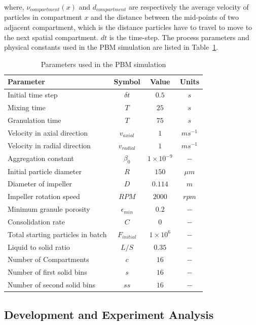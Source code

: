 \documentclass[preprint,11pt,authoryear]{elsarticle}
\begin{document}
where, $\nu_{compartment}(x)$ and $d_{compartment}$ are respectively the average velocity of 
particles in compartment $x$ and the distance between the mid-points of two adjacent compartment, 
which is the distance particles have to travel to move to the next spatial compartment. $dt$ is the 
time-step.
The process parameters and physical constants used in the PBM simulation are listed in Table~\ref{table:mthds_pbm_parameters}.
\begin{table}
\caption{Parameters used in the PBM simulation}
\label{table:mthds_pbm_parameters}
\begin{center}
\begin{tabular}{l|c|c|c}
\hline
\bf{Parameter} &\bf{Symbol} &\bf{Value} &\bf{Units}\\
\hline
Initial time step & $\delta t$ & $0.5$ & $s$\\
Mixing time & $T$ & $25$ & $s$\\
Granulation time & $T$ & $75$ & $s$\\
Velocity in axial direction & $v_{axial}$ & $1$ & $ms^{-1}$\\
Velocity in radial direction & $v_{radial}$ & $1$ & $ms^{-1}$\\
Aggregation constant & $\beta_0$ & $1\times10^{-9}$ & $-$\\
Initial particle diameter & $R$ & $150$ & $\mu m$\\
Diameter of impeller & $D$ & $0.114$ & $m$ \\
Impeller rotation speed & $RPM$ & $2000$ & $rpm$\\
Minimum granule porosity & $\epsilon_{min}$ & $0.2$ & $-$\\
Consolidation rate & $C$ & $0$ & $-$\\
Total starting particles in batch & $F_{initial}$ & $1 \times 10^{6}$ & $-$\\
Liquid to solid ratio & $L/S$ & $0.35$ & $-$ \\
Number of Compartments & $c$ & $16$ & $-$ \\
Number of first solid bins & $s$ & $16$ & $-$\\
Number of second solid bins & $ss$ & $16$ & $-$\\
\hline
\end{tabular}
\end{center}
\end{table}

\subsection{Development and Experiment Analysis}
\end{document}
